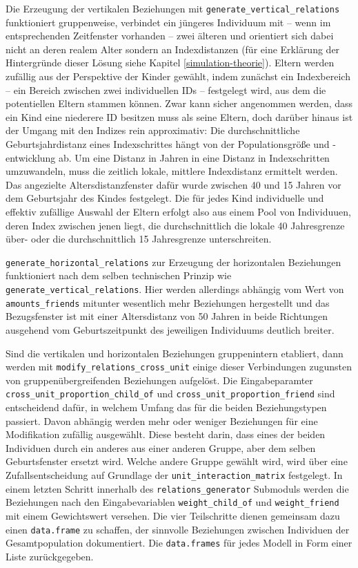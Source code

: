 \documentclass[openany,twoside,twocolumn]{book}
\begin{document}
Die Erzeugung der vertikalen Beziehungen mit
\texttt{generate\_vertical\_relations} funktioniert gruppenweise,
verbindet ein jüngeres Individuum mit -- wenn im entsprechenden
Zeitfenster vorhanden -- zwei älteren und orientiert sich dabei nicht an
deren realem Alter sondern an Indexdistanzen (für eine Erklärung der
Hintergründe dieser Lösung siehe Kapitel \ref{simulation-theorie}).
Eltern werden zufällig aus der Perspektive der Kinder gewählt, indem
zunächst ein Indexbereich -- ein Bereich zwischen zwei individuellen IDs
-- festgelegt wird, aus dem die potentiellen Eltern stammen können. Zwar
kann sicher angenommen werden, dass ein Kind eine niederere ID besitzen
muss als seine Eltern, doch darüber hinaus ist der Umgang mit den
Indizes rein approximativ: Die durchschnittliche Geburtsjahrdistanz
eines Indexschrittes hängt von der Populationsgröße und -entwicklung ab.
Um eine Distanz in Jahren in eine Distanz in Indexschritten umzuwandeln,
muss die zeitlich lokale, mittlere Indexdistanz ermittelt werden. Das
angezielte Altersdistanzfenster dafür wurde zwischen 40 und 15 Jahren
vor dem Geburtsjahr des Kindes festgelegt. Die für jedes Kind
individuelle und effektiv zufällige Auswahl der Eltern erfolgt also aus
einem Pool von Individuuen, deren Index zwischen jenen liegt, die
durchschnittlich die lokale 40 Jahresgrenze über- oder die
durchschnittlich 15 Jahresgrenze unterschreiten.

\texttt{generate\_horizontal\_relations} zur Erzeugung der horizontalen
Beziehungen funktioniert nach dem selben technischen Prinzip wie
\texttt{generate\_vertical\_relations}. Hier werden allerdings abhängig
vom Wert von \texttt{amounts\_friends} mitunter wesentlich mehr
Beziehungen hergestellt und das Bezugsfenster ist mit einer
Altersdistanz von 50 Jahren in beide Richtungen ausgehend vom
Geburtszeitpunkt des jeweiligen Individuums deutlich breiter.

Sind die vertikalen und horizontalen Beziehungen gruppenintern
etabliert, dann werden mit \texttt{modify\_relations\_cross\_unit}
einige dieser Verbindungen zugunsten von gruppenübergreifenden
Beziehungen aufgelöst. Die Eingabeparamter
\texttt{cross\_unit\_proportion\_child\_of} und
\texttt{cross\_unit\_proportion\_friend} sind entscheidend dafür, in
welchem Umfang das für die beiden Beziehungstypen passiert. Davon
abhängig werden mehr oder weniger Beziehungen für eine Modifikation
zufällig ausgewählt. Diese besteht darin, dass eines der beiden
Individuen durch ein anderes aus einer anderen Gruppe, aber dem selben
Geburtsfenster ersetzt wird. Welche andere Gruppe gewählt wird, wird
über eine Zufallsentscheidung auf Grundlage der
\texttt{unit\_interaction\_matrix} festgelegt. In einem letzten Schritt
innerhalb des \texttt{relations\_generator} Submoduls werden die
Beziehungen nach den Eingabevariablen \texttt{weight\_child\_of} und
\texttt{weight\_friend} mit einem Gewichtswert versehen. Die vier
Teilschritte dienen gemeinsam dazu einen \texttt{data.frame} zu
schaffen, der sinnvolle Beziehungen zwischen Individuen der
Gesamtpopulation dokumentiert. Die \texttt{data.frames} für jedes Modell
in Form einer Liste zurückgegeben.
\end{document}
